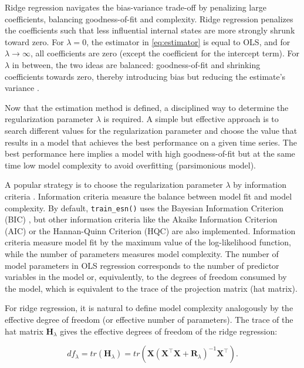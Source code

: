 Ridge regression navigates the bias-variance trade-off by penalizing large coefficients, balancing goodness-of-fit and complexity. Ridge regression penalizes the coefficients such that less influential internal states are more strongly shrunk toward zero. For \(\lambda = 0\), the estimator in \eqref{eq:estimator} is equal to OLS, and for \(\lambda \rightarrow \infty\), all coefficients are zero (except the coefficient for the intercept term). For \(\lambda\) in between, the two ideas are balanced: goodness-of-fit and shrinking coefficients towards zero, thereby introducing bias but reducing the estimate's variance \citep{Hastie2009}.

Now that the estimation method is defined, a disciplined way to determine the regularization parameter \(\lambda\) is required. A simple but effective approach is to search different values for the regularization parameter and choose the value that results in a model that achieves the best performance on a given time series. The best performance here implies a model with high goodness-of-fit but at the same time low model complexity to avoid overfitting (parsimonious model).

A popular strategy is to choose the regularization parameter \(\lambda\) by information criteria \citep{Burnham2002, Hastie2009}. Information criteria measure the balance between model fit and model complexity. By default, \texttt{train\_esn()} uses the Bayesian Information Criterion (BIC) \citep{Schwarz1978}, but other information criteria like the Akaike Information Criterion (AIC) \citep{Akaike1974} or the Hannan-Quinn Criterion (HQC) \citep{Hannan1979} are also implemented. Information criteria measure model fit by the maximum value of the log-likelihood function, while the number of parameters measures model complexity. The number of model parameters in OLS regression corresponds to the number of predictor variables in the model or, equivalently, to the degrees of freedom consumed by the model, which is equivalent to the trace of the projection matrix (hat matrix).

For ridge regression, it is natural to define model complexity analogously by the effective degree of freedom (or effective number of parameters). The trace of the hat matrix \(\mathbf{H}_\lambda\) gives the effective degrees of freedom of the ridge regression:

\begin{equation}
df_{\lambda} = tr\left(\mathbf{H}_\lambda\right) = tr\left({\mathbf{X}{{({\mathbf{X}^{\top}\mathbf{X} + \mathbf{R}_{\lambda}})}^{ - 1}}\mathbf{X}^{\top}}\right).
\label{eq:dof}
\end{equation}

